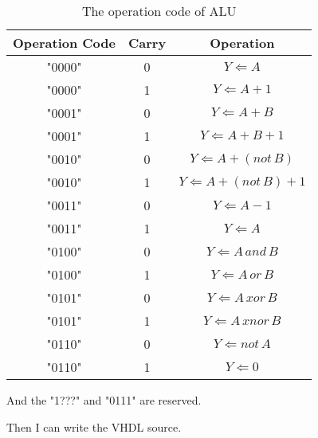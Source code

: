 \documentclass{article}
\begin{document}
    \begin{table}
        \centering
        \begin{tabular}{|c|c|c|}
            \hline Operation Code & Carry & Operation \\ 
            \hline "0000" & 0 & $ Y \Leftarrow A$ \\ 
            \hline "0000" & 1 & $ Y \Leftarrow A + 1$ \\ 
            \hline "0001" & 0 & $ Y \Leftarrow A + B $ \\ 
            \hline "0001" & 1 & $ Y \Leftarrow A + B + 1 $ \\ 
            \hline "0010" & 0 & $ Y \Leftarrow A + (not\,B)$ \\ 
            \hline "0010" & 1 & $ Y \Leftarrow A +(not\,B) + 1$ \\
            \hline "0011" & 0 & $ Y \Leftarrow A - 1$ \\
            \hline "0011" & 1 & $ Y \Leftarrow A$ \\ 
            \hline "0100" & 0 & $ Y \Leftarrow A\,and\,B $ \\
            \hline "0100" & 1 & $ Y \Leftarrow A\,or\,B $ \\
            \hline "0101" & 0 & $ Y \Leftarrow A\,xor\,B $ \\
            \hline "0101" & 1 & $ Y \Leftarrow A\,xnor\,B$ \\
            \hline "0110" & 0 & $ Y \Leftarrow not\,A$ \\
            \hline "0110" & 1 & $ Y \Leftarrow 0 $\\
            \hline
        \end{tabular}
        \caption{The operation code of ALU}
        \label{tab:alu:code}
    \end{table} 
    
    And the "1???" and "0111" are reserved.
    
    
    Then I can write the VHDL source.
    
    
\end{document}
